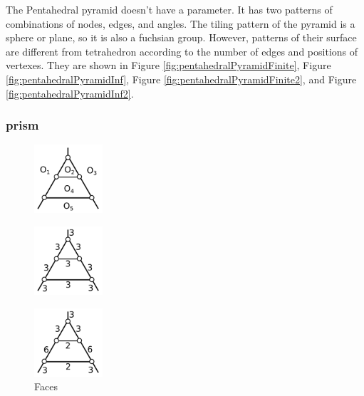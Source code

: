 \documentclass[suppldata, dvipdfmx]{interact}
\theoremstyle{plain}%
\theoremstyle{definition}
\theoremstyle{remark}
\theoremstyle{problemstyle}
\begin{document}
The Pentahedral pyramid doesn't have a parameter. It has two patterns
of combinations of nodes, edges, and angles.
The tiling pattern of the pyramid is a sphere or plane, so it is also a fuchsian group.
However, patterns of their surface are
different from tetrahedron according to the number of edges and positions of
vertexes.
They are shown in 
Figure \ref{fig:pentahedralPyramidFinite}, Figure
\ref{fig:pentahedralPyramidInf},
Figure \ref{fig:pentahedralPyramidFinite2}, and
Figure \ref{fig:pentahedralPyramidInf2}.
\subsubsection{prism}

\begin{figure}[h!tbp]
  \begin{minipage}[t]{0.23\textwidth}
   \centering
   \includegraphics[width=1in, keepaspectratio]{./img/HexahedraWithSphericalFaces/pentahedralPrism/pentahedralPrismFaces.png}
   \caption{Faces}
   \label{fig:}
  \end{minipage}
 \hspace*{\fill}
 \begin{minipage}[t]{0.69\textwidth}
  \begin{minipage}[t]{0.23\textwidth}
   \centering
   \includegraphics[width=1in,
   keepaspectratio]{./img/HexahedraWithSphericalFaces/pentahedralPrism/pentahedralPrism_a.png}
   \subcaption{}
   \label{fig:}
  \end{minipage}
  \hspace*{\fill}
  \begin{minipage}[t]{0.23\textwidth}
   \centering
   \includegraphics[width=1in, keepaspectratio]{./img/HexahedraWithSphericalFaces/pentahedralPrism/pentahedralPrism_b.png}

\end{minipage}
\end{minipage}
\end{figure}
\end{document}
